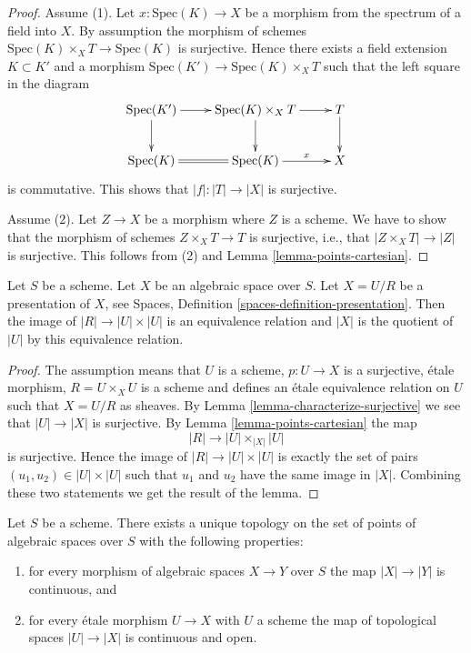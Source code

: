 \begin{proof}
Assume (1). Let $x : \text{Spec}(K) \to X$ be a morphism
from the spectrum of a field into $X$. By assumption the morphism of
schemes $\text{Spec}(K) \times_X T \to \text{Spec}(K)$ is surjective.
Hence there exists a field extension $K \subset K'$ and a morphism
$\text{Spec}(K') \to \text{Spec}(K) \times_X T$ such that the left
square in the diagram
$$
\xymatrix{
\text{Spec}(K') \ar[r] \ar[d] &
\text{Spec}(K) \times_X T \ar[d] \ar[r] &
T \ar[d] \\
\text{Spec}(K) \ar@{=}[r] &
\text{Spec}(K) \ar[r]^-x & X
}
$$
is commutative. This shows that $|f| : |T| \to |X|$ is surjective.

\medskip\noindent
Assume (2). Let $Z \to X$ be a morphism where $Z$ is
a scheme. We have to show that the morphism of schemes $Z \times_X T \to T$
is surjective, i.e., that $|Z \times_X T| \to |Z|$ is surjective.
This follows from (2) and
Lemma \ref{lemma-points-cartesian}.
\end{proof}

\begin{lemma}
\label{lemma-points-presentation}
Let $S$ be a scheme.
Let $X$ be an algebraic space over $S$.
Let $X = U/R$ be a presentation of $X$, see
Spaces, Definition \ref{spaces-definition-presentation}.
Then the image of $|R| \to |U| \times |U|$ is an equivalence relation
and $|X|$ is the quotient of $|U|$ by this equivalence relation.
\end{lemma}

\begin{proof}
The assumption means that $U$ is a scheme, $p : U \to X$ is a surjective,
\'etale morphism, $R = U \times_X U$ is a scheme and defines an \'etale
equivalence relation on $U$ such that $X = U/R$ as sheaves. By
Lemma \ref{lemma-characterize-surjective}
we see that $|U| \to |X|$ is surjective. By
Lemma \ref{lemma-points-cartesian}
the map
$$
|R| \longrightarrow |U| \times_{|X|} |U|
$$
is surjective. Hence the image of $|R| \to |U| \times |U|$ is
exactly the set of pairs $(u_1, u_2) \in |U| \times |U|$
such that $u_1$ and $u_2$ have the same image in $|X|$.
Combining these two statements we get the result of the lemma.
\end{proof}

\begin{lemma}
\label{lemma-topology-points}
Let $S$ be a scheme. There exists a unique topology on the set of points
of algebraic spaces over $S$ with the following properties:
\begin{enumerate}
\item for every morphism of algebraic spaces $X \to Y$ over $S$
the map $|X| \to |Y|$ is continuous, and
\item for every \'etale morphism $U \to X$ with $U$ a scheme
the map of topological spaces $|U| \to |X|$ is continuous and open.
\end{enumerate}
\end{lemma}

